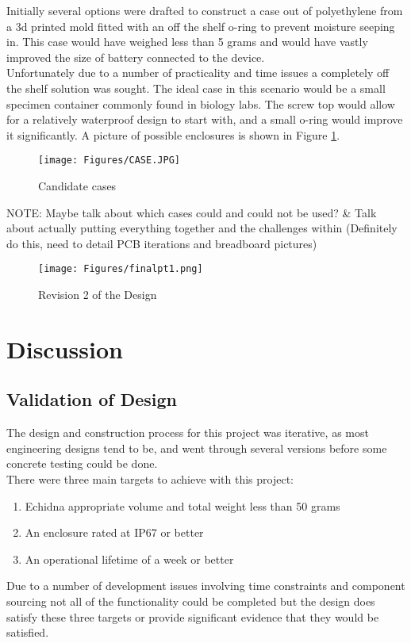 \documentclass[12pt,openany,a4paper]{book}
\begin{document}
	Initially several options were drafted to construct a case out of polyethylene from a 3d printed mold fitted with an off the shelf o-ring to prevent moisture seeping in. This case would have weighed less than 5 grams and would have vastly improved the size of battery connected to the device. \\
	
	Unfortunately due to a number of practicality and time issues a completely off the shelf solution was sought. The ideal case in this scenario would be a small specimen container commonly found in biology labs. The screw top would allow for a relatively waterproof design to start with, and a small o-ring would improve it significantly. A picture of possible enclosures is shown in Figure \ref{fig:CASE}.
	
	\begin{figure}[H]
		\centering
		\texttt{[image: Figures/CASE.JPG]}
		\caption{Candidate cases}
		\label{fig:CASE}
	\end{figure}			

	NOTE: Maybe talk about which cases could and could not be used? \& Talk about actually putting everything together and the challenges within (Definitely do this, need to detail PCB iterations and breadboard pictures)\\
	
		\begin{figure}[H]
			\centering
			\texttt{[image: Figures/finalpt1.png]}
			\caption{Revision 2 of the Design}
			\label{fig:FIN}
		\end{figure}	
		
	\noindent\makebox[\linewidth]{\rule{\paperwidth}{0.4pt}}
	\noindent\makebox[\linewidth]{\rule{\paperwidth}{0.4pt}}
		
\chapter{Discussion}

	\section{Validation of Design}
		The design and construction process for this project was iterative, as most engineering designs tend to be, and went through several versions before some concrete testing could be done. \\
		
		There were three main targets to achieve with this project: \\
		\begin{enumerate}
			\item Echidna appropriate volume and total weight less than 50 grams
			\item An enclosure rated at IP67 or better
			\item An operational lifetime of a week or better
		\end{enumerate} 
		Due to a number of development issues involving time constraints and component sourcing not all of the functionality could be completed but the design does satisfy these three targets or provide significant evidence that they would be satisfied.\\
\end{document}

